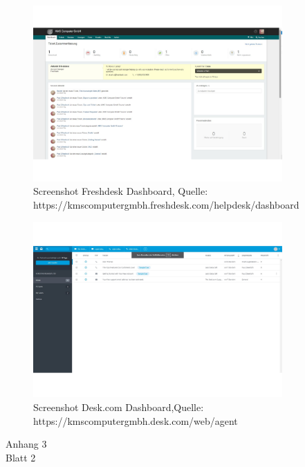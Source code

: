 \begin{figure}[h!]
\includegraphics[width=0.85\textwidth]{Abbildungen/Freshdesk.pdf}
\caption*{Screenshot Freshdesk Dashboard, \newline
Quelle: https://kmscomputergmbh.freshdesk.com/helpdesk/dashboard}
\label{Freshdesk}
\end{figure}



\begin{figure}[h!]
\includegraphics[width=0.85\textwidth]{Abbildungen/Deskcom.pdf}
\caption*{Screenshot Desk.com Dashboard,Quelle: https://kmscomputergmbh.desk.com/web/agent}
\label{Deskcom}
\end{figure}

\newpage

\begin{flushright}
Anhang 3\\
Blatt 2\\
\label{Anhang3_2}
\end{flushright}


